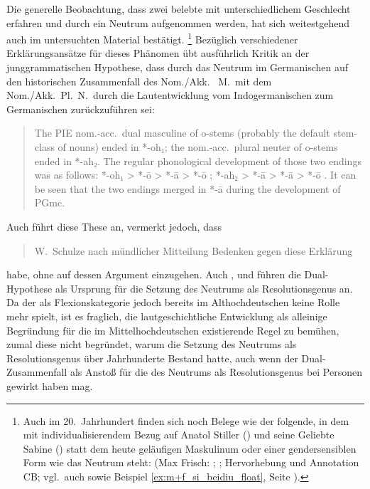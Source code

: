 Die generelle Beobachtung, dass zwei belebte  mit
unterschiedlichem Geschlecht  erfahren und durch ein
Neutrum aufgenommen werden, hat sich weitestgehend auch im untersuchten
Material bestätigt.%
%
	\footnote{Auch im 20.~Jahrhundert finden sich noch
		Belege wie der folgende, in dem mit
		individualisierendem Bezug auf Anatol Stiller
		(\MascM) und seine Geliebte Sabine (\FemF) statt dem heute geläufigen
		Maskulinum oder einer gendersensiblen Form wie 
		das Neutrum steht:  (Max Frisch:
		; \cite[332--333]{frisch:stiller}; Hervorhebung und
		Annotation CB; vgl.~auch \cite[188]{dal2014} sowie Beispiel
		\ref{ex:m+f_si_beidiu_float}, Seite \pageref{ex:m+f_si_beidiu_float}).
	}
%
Bezüglich verschiedener Erklärungs\-ansätze für dieses Phänomen übt
\citet[213--221]{askedal1973} ausführlich Kritik an der
junggrammatischen Hypothese, dass 
durch das Neutrum im Germanischen auf den
historischen Zusammenfall des Nom./Akk.\  M.\ mit dem
Nom./Akk.~Pl.~N.\ durch die Laut\-entwicklung vom
Indogermanischen zum Germanischen
zurückzuführen sei: \foreignblockcquote{english}[196]{ringe2017}{The PIE
nom.-acc.\ dual masculine of o-stems (probably the default
stem-class of nouns) ended in *-oh₁; the nom.-acc.\ plural neuter of o-stems
ended in *-ah₂. The regular phonological development of those two endings was
as follows: *-oh₁ > *-ō \textelp{} > *-ā > *-ō \textelp{}; *-ah₂ > *-ā
\textelp{} > *-ā > *-ō \textelp{}. It can be seen that the two endings merged
in *-ā during the development of PGmc.}

Auch \citeauthor{behaghel1928} führt diese These an, vermerkt
jedoch, dass \blockcquote[40]{behaghel1928}{W.~Schulze \textelp{} nach
mündlicher Mitteilung Bedenken gegen diese Erklärung} habe, ohne
auf dessen Argument einzugehen. Auch \citet[157]{hock2008},
\citet[196]{ringe2017} und \citet[104]{miller2019} führen die Dual-Hypothese
als Ursprung für die Setzung des Neutrums als Resolutionsgenus an. Da der  als Flexionskategorie jedoch bereits im
Althochdeutschen keine Rolle mehr spielt, ist es fraglich,
die lautgeschichtliche Entwicklung als alleinige Begründung für die im
Mittel\-hoch\-deutschen existierende Regel zu bemühen,
zumal diese nicht begründet, warum die Setzung des Neutrums als
Resolutionsgenus über Jahrhunderte Bestand hatte, auch
wenn der Dual-Zusammenfall als Anstoß für die  des
Neutrums als Resolutionsgenus bei Personen gewirkt haben mag.

